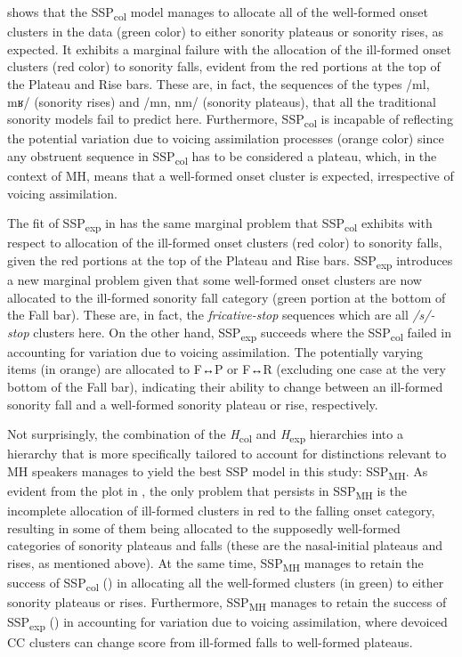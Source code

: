  shows that the SSP\textsubscript{col} model manages to allocate all of the well-formed onset clusters in the data (green color) to either sonority plateaus or sonority rises, as expected. It exhibits a marginal failure with the allocation of the ill-formed onset clusters (red color) to sonority falls, evident from the red portions at the top of the Plateau and Rise bars. These are, in fact, the sequences of the types /ml, mʁ/ (sonority rises) and /mn, nm/ (sonority plateaus), that all the traditional sonority models fail to predict here.
Furthermore, SSP\textsubscript{col} is incapable of reflecting the potential variation due to voicing assimilation processes (orange color) since any obstruent sequence in SSP\textsubscript{col} has to be considered a plateau, which, in the context of MH, means that a well-formed onset cluster is expected, irrespective of voicing assimilation.

The fit of SSP\textsubscript{exp} in  has the same marginal problem that SSP\textsubscript{col} exhibits with respect to allocation of the ill-formed onset clusters (red color) to sonority falls, given the red portions at the top of the Plateau and Rise bars. SSP\textsubscript{exp} introduces a new marginal problem given that some well-formed onset clusters are now allocated to the ill-formed sonority fall category (green portion at the bottom of the Fall bar). These are, in fact, the \emph{fricative-stop} sequences which are all \emph{/s/-stop} clusters here. On the other hand, SSP\textsubscript{exp} succeeds where the SSP\textsubscript{col} failed in accounting for variation due to voicing assimilation.
The potentially varying items (in orange) are allocated to F↔P or F↔R (excluding one case at the very bottom of the Fall bar), indicating their ability to change between an ill-formed sonority fall and a well-formed sonority plateau or rise, respectively.

Not surprisingly, the combination of the \emph{H}\textsubscript{col} and \emph{H}\textsubscript{exp} hierarchies into a hierarchy that is more specifically tailored to account for distinctions relevant to MH speakers manages to yield the best SSP model in this study: SSP\textsubscript{MH}. As evident from the plot in , the only problem that persists in SSP\textsubscript{MH} is the incomplete allocation of ill-formed clusters in red to the falling onset category, resulting in some of them being allocated to the supposedly well-formed categories of sonority plateaus and falls (these are the nasal-initial plateaus and rises, as mentioned above).
At the same time, SSP\textsubscript{MH} manages to retain the success of SSP\textsubscript{col} () in allocating all the well-formed clusters (in green) to either sonority plateaus or rises. Furthermore, SSP\textsubscript{MH} manages to retain the success of SSP\textsubscript{exp} () in accounting for variation due to voicing assimilation, where devoiced CC clusters can change score from ill-formed falls to well-formed plateaus.

